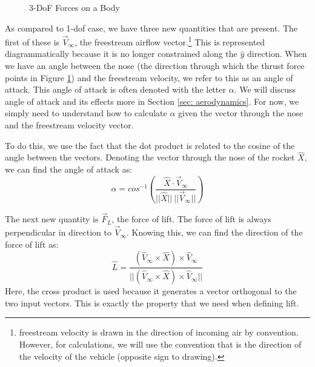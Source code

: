 \documentclass[12pt]{report}
\begin{document}
\begin{figure}[ht]
\begin{tikzpicture}[x=0.75pt,y=0.75pt,yscale=-1,xscale=1]
\end{tikzpicture}

    \caption{3-DoF Forces on a Body}
    \label{fig:3 DoF Forces}
\end{figure}

As compared to 1-\gls{dof} case, we have three new quantities that are present. The first of these is $\vec{V}_{\infty}$, the \gls{freestream} airflow vector.\footnote{\gls{freestream} velocity  is drawn in the direction of incoming air by convention. However, for calculations, we will use the convention that  is the direction of the velocity of the vehicle (opposite sign to drawing).} This is represented diagrammatically because it is no longer constrained along the $\hat{y}$ direction. When we have an angle between the nose (the direction through which the thrust force points in Figure \ref{fig:3 DoF Forces}) and the \gls{freestream} velocity, we refer to this as an \gls{angle of attack}. This \gls{angle of attack} is often denoted with the letter $\alpha$. We will discuss \gls{angle of attack} and its effects more in Section \ref{sec: aerodynamics}. For now, we simply need to understand how to calculate $\alpha$ given the vector through the nose and the \gls{freestream} velocity vector.

To do this, we use the fact that the dot product is related to the cosine of the angle between the vectors. Denoting the vector through the nose of the rocket $\hat{X}$, we can find the \gls{angle of attack} as:
\begin{equation}\label{eq:alpha}
    \alpha=cos^{-1}\left(\frac{\hat{X}\cdot \vec{V}_{\infty}}{||\hat{X}||\ ||\vec{V}_{\infty}||}\right)
\end{equation}

The next new quantity is $\vec{F}_L$, the force of lift. The force of lift is always perpendicular in direction to $\vec{V}_{\infty}$. Knowing this, we can find the direction of the force of lift as:
\begin{equation}\label{eq:Lift}
    \hat{L}=\frac{(\hat{V}_{\infty} \times \hat{X}) \times \hat{V}_{\infty}}{||(\hat{V}_{\infty} \times \hat{X}) \times \hat{V}_{\infty}||}
\end{equation}
Here, the cross product is used because it generates a vector orthogonal to the two input vectors. This is exactly the property that we need when defining lift.
\end{document}
